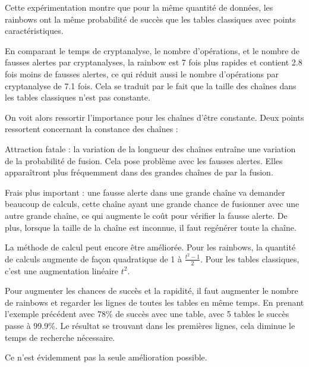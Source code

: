 		\bigskip

		Cette expérimentation montre que pour la même quantité de données, les \glspl{rainbow} ont la même probabilité de succès que les tables classiques avec points caractéristiques.

		\bigskip

		En comparant le temps de cryptanalyse, le nombre d'opérations, et le nombre de fausses alertes par cryptanalyses, la \gls{rainbow} est 7 fois plus rapides et contient 2.8 fois moins de fausses alertes, ce qui réduit aussi le nombre d'opérations par cryptanalyse de 7.1 fois. Cela se traduit par le fait que la taille des chaînes dans les tables classiques n'est pas constante.

		\bigskip

		On voit alors ressortir l'importance pour les chaînes d'être constante. Deux points ressortent concernant la constance des chaînes\cite{Oech03} :

		\bi
			\item Attraction fatale : la variation de la longueur des chaînes entraîne une variation de la probabilité de fusion. Cela pose problème avec les fausses alertes. Elles apparaîtront plus fréquemment dans des grandes chaînes de par la fusion.
			\item Frais plus important : une fausse alerte dans une grande chaîne va demander beaucoup de calculs, cette chaîne ayant une grande chance de fusionner avec une autre grande chaîne, ce qui augmente le coût pour vérifier la fausse alerte. De plus, lorsque la taille de la chaîne est inconnue, il faut regénérer toute la chaîne.
		\ei


		La méthode de calcul peut encore être améliorée. Pour les \glspl{rainbow}, la quantité de calculs augmente de façon quadratique de 1 à $\frac{t^2-1}{2}$. Pour les tables classiques, c'est une augmentation linéaire $t^2$.

		\bigskip

		Pour augmenter les chances de succès et la rapidité, il faut augmenter le nombre de \glspl{rainbow} et regarder les lignes de toutes les tables en même temps. En prenant l'exemple précédent avec 78\% de succès avec une table, avec 5 tables le succès passe à 99.9\%. Le résultat se trouvant dans les premières lignes, cela diminue le temps de recherche nécessaire.

		Ce n'est évidemment pas la seule amélioration possible.

\endinput{}
